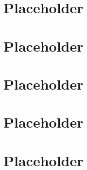 \documentclass[a4paper]{article}
\begin{document}
  \section{Placeholder} 
  \section{Placeholder} 
  \section{Placeholder} 
  \section{Placeholder} 
  \section{Placeholder} 
\end{document}
